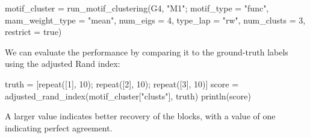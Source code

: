 \documentclass{article}
\begin{document}
\begin{tcolorbox}[colback=black!5!white,colframe=black!15!white]
\begin{juliablock}
motif_cluster = run_motif_clustering(G4, "M1";
                                     motif_type = "func",
                                     mam_weight_type = "mean",
                                     num_eigs = 4,
                                     type_lap = "rw",
                                     num_clusts = 3,
                                     restrict = true)
\end{juliablock}
\end{tcolorbox}

We can evaluate the performance by comparing it to the ground-truth
labels using the adjusted Rand index:

\begin{tcolorbox}[colback=black!5!white,colframe=black!15!white]
\begin{juliablock}
truth = [repeat([1], 10); repeat([2], 10); repeat([3], 10)]
score = adjusted_rand_index(motif_cluster["clusts"], truth)
println(score)
\end{juliablock}
\texttt{\obeylines\printpythontex}
\end{tcolorbox}

A larger value indicates better recovery of the blocks,
with a value of one indicating perfect agreement.



\end{document}
